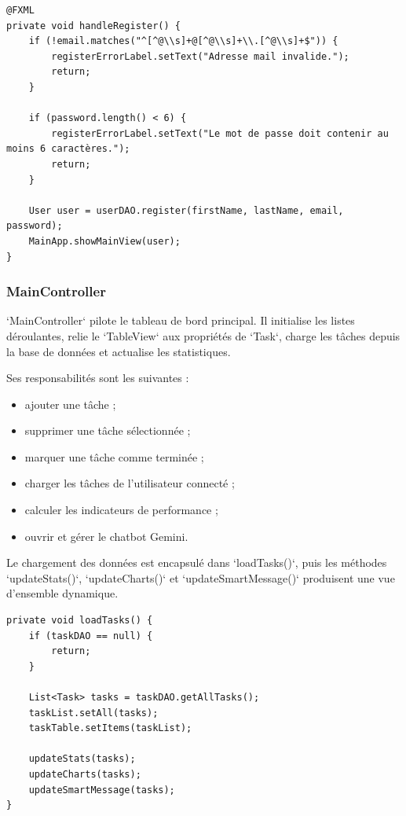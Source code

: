 \documentclass[11pt,a4paper]{article}
\begin{document}
\begin{lstlisting}[style=javaStyle,caption={Inscription d'un utilisateur}]
@FXML
private void handleRegister() {
    if (!email.matches("^[^@\\s]+@[^@\\s]+\\.[^@\\s]+$")) {
        registerErrorLabel.setText("Adresse mail invalide.");
        return;
    }

    if (password.length() < 6) {
        registerErrorLabel.setText("Le mot de passe doit contenir au moins 6 caractères.");
        return;
    }

    User user = userDAO.register(firstName, lastName, email, password);
    MainApp.showMainView(user);
}
\end{lstlisting}

\subsubsection{MainController}

`MainController` pilote le tableau de bord principal. Il initialise les listes déroulantes, relie le `TableView` aux propriétés de `Task`, charge les tâches depuis la base de données et actualise les statistiques.

Ses responsabilités sont les suivantes :
\begin{itemize}[leftmargin=1.4em]
    \item ajouter une tâche ;
    \item supprimer une tâche sélectionnée ;
    \item marquer une tâche comme terminée ;
    \item charger les tâches de l'utilisateur connecté ;
    \item calculer les indicateurs de performance ;
    \item ouvrir et gérer le chatbot Gemini.
\end{itemize}

Le chargement des données est encapsulé dans `loadTasks()`, puis les méthodes `updateStats()`, `updateCharts()` et `updateSmartMessage()` produisent une vue d'ensemble dynamique.

\begin{lstlisting}[style=javaStyle,caption={Chargement et affichage des tâches}]
private void loadTasks() {
    if (taskDAO == null) {
        return;
    }

    List<Task> tasks = taskDAO.getAllTasks();
    taskList.setAll(tasks);
    taskTable.setItems(taskList);

    updateStats(tasks);
    updateCharts(tasks);
    updateSmartMessage(tasks);
}
\end{lstlisting}
\end{document}
